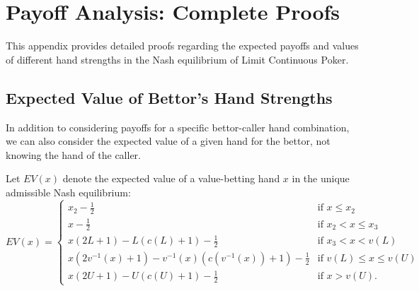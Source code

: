\documentclass[../../main/main.tex]{subfiles}
\begin{document}
\section{Payoff Analysis: Complete Proofs}
\label{sec:payoff_analysis}

This appendix provides detailed proofs regarding the expected payoffs and values of different hand strengths in the Nash equilibrium of Limit Continuous Poker.

\subsection{Expected Value of Bettor's Hand Strengths}

In addition to considering payoffs for a specific bettor-caller hand combination, we can also consider the expected value of a given hand for the bettor, not knowing the hand of the caller.

\begin{theorem}
    \label{thm:ev_bettor}
    Let $EV(x)$ denote the expected value of a value-betting hand $x$ in the unique admissible Nash equilibrium:
    \begin{equation}
        EV(x) = \begin{cases}
            x_2-\frac{1}{2} & \text{if } x \leq x_2 \\
            x-\frac{1}{2} & \text{if } x_2 < x \le x_3 \\
            x(2L + 1) - L(c(L) + 1) - \frac{1}{2} & \text{if } x_3 < x < v(L) \\
            x(2v^{-1}(x) + 1) - v^{-1}(x)(c(v^{-1}(x)) + 1) - \frac{1}{2} & \text{if } v(L) \leq x \leq v(U) \\
            x(2U + 1) - U(c(U) + 1) - \frac{1}{2} & \text{if } x > v(U).
        \end{cases}
    \end{equation}
\end{theorem}
\end{document}
